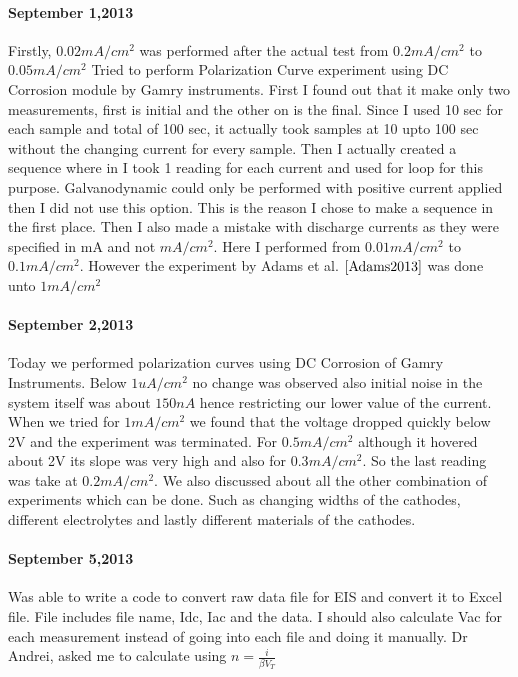 \documentclass[12pt]{book}
\begin{document}

\paragraph*{September 1,2013}
Firstly, $0.02mA/cm^2$ was performed after the actual test from $0.2mA/cm^2$ to $0.05mA/cm^2$ Tried to perform Polarization Curve experiment using DC Corrosion module by Gamry instruments. First I found out that it make only two measurements, first is initial and the other on is the final. Since I used 10 sec for each sample and total of 100 sec, it actually took samples at 10 upto 100 sec without the changing current for every sample. Then I actually created a sequence where in I took 1 reading for each current and used for loop for this purpose. Galvanodynamic could only be performed with positive current applied then I did not use this option. This is the reason I chose to make a sequence in the first place. Then I also made a mistake with discharge currents as they were specified in mA and not $mA/cm^2$. Here I performed from $0.01mA/cm^2$ to $0.1mA/cm^2$. However the experiment by Adams et al. $\cite{Adams2013}$ was done unto $1mA/cm^2$
\paragraph*{September 2,2013}
 Today we performed polarization curves using DC Corrosion of Gamry Instruments. Below $1uA/cm^2$ no change was observed also initial noise in the system itself was about $150nA$ hence restricting our lower value of the current. When we tried for $1mA/cm^2$ we found that the voltage dropped quickly below 2V and the experiment was terminated. For $0.5mA/cm^2$ although it hovered about 2V its slope was very high and also for $0.3mA/cm^2$. So the last reading was take at $0.2mA/cm^2$. We also discussed about all the other combination of experiments which can be done. Such as changing widths of the cathodes, different electrolytes and lastly different materials of the cathodes.
\paragraph*{September 5,2013}
 Was able to write a code to convert raw data file for EIS and convert it to Excel file. File includes file name, Idc, Iac and the data. I should also calculate Vac for each measurement instead of going into each file and doing it manually. Dr Andrei, asked me to calculate using $n=\frac{i}{\beta V_T}$
\end{document}
